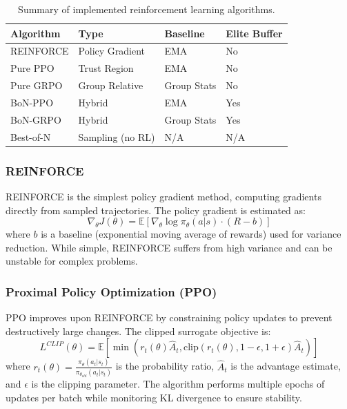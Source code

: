 \begin{table}[h!]
    \centering
    \caption{Summary of implemented reinforcement learning algorithms.}
    \label{tab:rl_algorithms}
    \begin{tabular}{llll}
    \toprule
    \textbf{Algorithm} & \textbf{Type} & \textbf{Baseline} & \textbf{Elite Buffer} \\
    \midrule
    REINFORCE & Policy Gradient & EMA & No \\
    Pure PPO & Trust Region & EMA & No \\
    Pure GRPO & Group Relative & Group Stats & No \\
    BoN-PPO & Hybrid & EMA & Yes \\
    BoN-GRPO & Hybrid & Group Stats & Yes \\
    Best-of-N & Sampling (no RL) & N/A & N/A \\
    \bottomrule
    \end{tabular}
\end{table}

\subsubsection{REINFORCE}

REINFORCE \cite{Williams1992Simple} is the simplest policy gradient method, computing gradients directly from sampled trajectories. The policy gradient is estimated as:
\begin{equation}
    \nabla_\theta J(\theta) = \mathbb{E}\left[ \nabla_\theta \log \pi_\theta(a|s) \cdot (R - b) \right]
\end{equation}
where $b$ is a baseline (exponential moving average of rewards) used for variance reduction. While simple, REINFORCE suffers from high variance and can be unstable for complex problems.

\subsubsection{Proximal Policy Optimization (PPO)}

PPO \cite{Schulman2017ProximalPO} improves upon REINFORCE by constraining policy updates to prevent destructively large changes. The clipped surrogate objective is:
\begin{equation}
    L^{CLIP}(\theta) = \mathbb{E}\left[ \min\left( r_t(\theta) \hat{A}_t, \text{clip}(r_t(\theta), 1-\epsilon, 1+\epsilon) \hat{A}_t \right) \right]
\end{equation}
where $r_t(\theta) = \frac{\pi_\theta(a_t|s_t)}{\pi_{\theta_{old}}(a_t|s_t)}$ is the probability ratio, $\hat{A}_t$ is the advantage estimate, and $\epsilon$ is the clipping parameter. The algorithm performs multiple epochs of updates per batch while monitoring KL divergence to ensure stability.

